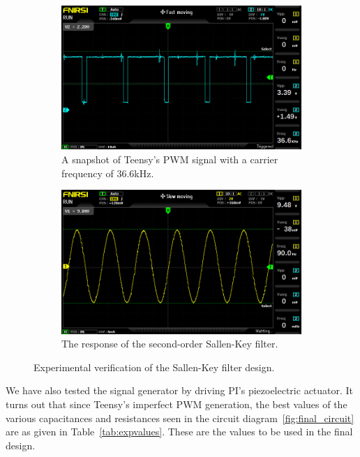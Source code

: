 \begin{figure}[bh]
    \centering
    \begin{subfigure}[b]{0.5\textwidth}
        \centering
        \includegraphics[width=1.0\textwidth]{./figures/teensy_pwm_osc.jpg}
        \caption{A snapshot of Teensy's PWM signal with a carrier frequency of
        $36.6$\unit{\kilo\hertz}.}
        \label{fig:teensy_pwm}
    \end{subfigure}
    \begin{subfigure}[b]{0.5\textwidth}
        \includegraphics[width=1.0\textwidth]{./figures/output_osc.jpg}
        \caption{The response of the second-order Sallen-Key filter.}
        \label{fig:sallenkey_osc}
    \end{subfigure}
    \caption{Experimental verification of the Sallen-Key filter design.}
    \label{fig:exp}
\end{figure}

We have also tested the signal generator by driving PI's piezoelectric actuator.
It turns out that since Teensy's imperfect PWM generation, the best values of
the various capacitances and resistances seen in the circuit
diagram~\ref{fig:final_circuit} are as given in Table~\ref{tab:expvalues}. These
are the values to be used in the final design.

